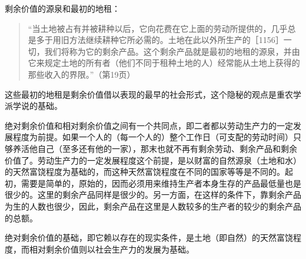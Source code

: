 
剩余价值的源泉和最初的地租：

\begin{quote}{“当土地被占有并被耕种以后，它向花费在它上面的劳动所提供的，几乎总是多于用旧方法继续耕种它所必需的。土地在此以外所生产的［1156］一切，我们将称为它的剩余产品。这个剩余产品就是最初的地租的源泉，并由它来规定土地的所有者（他们不同于租种土地的人）经常能从土地上获得的那些收入的界限。”（第19页）}\end{quote}

这些最初的地租是剩余价值借以表现的最早的社会形式，这个隐秘的观点是重农学派学说的基础。

绝对剩余价值和相对剩余价值之间有一个共同点，即二者都以劳动生产力的一定发展程度为前提。如果一个人的（每一个人的）整个工作日（可支配的劳动时间）只够养活他自己（至多还有他的一家），那末也就不再有剩余劳动、剩余产品和剩余价值了。劳动生产力的一定发展程度这个前提，是以财富的自然源泉（土地和水）的天然富饶程度为基础的，而这种天然富饶程度在不同的国家等等是不同的。起初，需要是简单的，原始的，因而必须用来维持生产者本身生存的产品最低量也是很少的。这里的剩余产品同样是很少的。另一方面，在这样的条件下，靠剩余产品为生的人数也很少，因此，剩余产品在这里是人数较多的生产者的较少的剩余产品的总额。

绝对剩余价值的基础，即它赖以存在的现实条件，是土地（即自然）的天然富饶程度，而相对剩余价值则以社会生产力的发展为基础。



